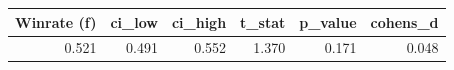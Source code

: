 \begin{tabular}{rrrrrr}
\toprule
Winrate (f) & ci\_low & ci\_high & t\_stat & p\_value & cohens\_d \\
\midrule
0.521 & 0.491 & 0.552 & 1.370 & 0.171 & 0.048 \\
\bottomrule
\end{tabular}
